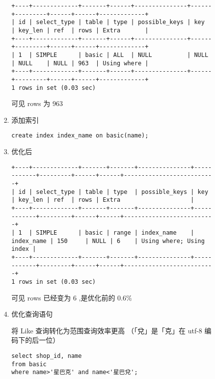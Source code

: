 \documentclass[11pt]{article}
\begin{document}
\begin{itemize}
\begin{enumerate}
\begin{enumerate}
\begin{enumerate}
\begin{verbatim}
+----+-------------+-------+------+---------------+------+---------+------+------+-------------+
| id | select_type | table | type | possible_keys | key  | key_len | ref  | rows | Extra       |
+----+-------------+-------+------+---------------+------+---------+------+------+-------------+
| 1  | SIMPLE      | basic | ALL  | NULL          | NULL | NULL    | NULL | 963  | Using where |
+----+-------------+-------+------+---------------+------+---------+------+------+-------------+
1 rows in set (0.03 sec)
\end{verbatim}

可见 rows 为 963

\item 添加索引

\begin{lstlisting}
create index index_name on basic(name);
\end{lstlisting}

\item 优化后

\begin{verbatim}
+----+-------------+-------+-------+---------------+------------+---------+------+------+--------------------------+
| id | select_type | table | type  | possible_keys | key        | key_len | ref  | rows | Extra                    |
+----+-------------+-------+-------+---------------+------------+---------+------+------+--------------------------+
| 1  | SIMPLE      | basic | range | index_name    | index_name | 150     | NULL | 6    | Using where; Using index |
+----+-------------+-------+-------+---------------+------------+---------+------+------+--------------------------+
1 rows in set (0.03 sec)
\end{verbatim}

可见 rows 已经变为 6 ,是优化前的 0.6\%

\item 优化查询语句

将 Like 查询转化为范围查询效率更高 （「兌」是「克」在 utf-8 编码下的后一位）

\begin{lstlisting}
select shop_id, name
from basic
where name>'星巴克' and name<'星巴兌';
\end{lstlisting}
\end{enumerate}
\end{enumerate}
\end{enumerate}
\end{itemize}
\end{document}
